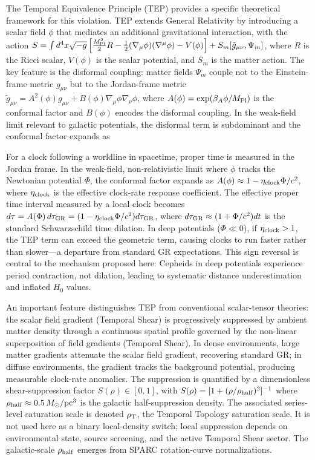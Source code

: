 \documentclass[
]{article}
\begin{document}
The Temporal Equivalence Principle (TEP) provides a specific theoretical
framework for this violation. TEP extends General Relativity by
introducing a scalar field \(\phi\) that mediates an additional
gravitational interaction, with the action
\(S = \int d^4x \sqrt{-g} \left[ \frac{M_{\rm Pl}^2}{2} R - \frac{1}{2}(\nabla_\mu
\phi)(\nabla^\mu \phi) - V(\phi) \right] + S_m[\tilde{g}_{\mu\nu},
\Psi_m]\), where \(R\) is the Ricci scalar, \(V(\phi)\) is the scalar
potential, and \(S_m\) is the matter action. The key feature is the
disformal coupling: matter fields \(\Psi_m\) couple not to the
Einstein-frame metric \(g_{\mu\nu}\) but to the Jordan-frame metric
\(\tilde{g}_{\mu\nu} = A^2(\phi) g_{\mu\nu} + B(\phi) \nabla_\mu\phi \nabla_\nu\phi\),
where \(A(\phi) = \exp(\beta_A\phi/M_{\rm Pl})\) is the conformal factor
and \(B(\phi)\) encodes the disformal coupling. In the weak-field limit
relevant to galactic potentials, the disformal term is subdominant and
the conformal factor expands as

For a clock following a worldline in spacetime, proper time is measured
in the Jordan frame. In the weak-field, non-relativistic limit where
\(\phi\) tracks the Newtonian potential \(\Phi\), the conformal factor
expands as \(A(\phi) \approx 1 - \eta_{\rm clock} \Phi/c^2\), where
\(\eta_{\rm clock}\) is the effective clock-rate response coefficient.
The effective proper time interval measured by a local clock becomes
\(d\tau = A(\Phi) \, d\tau_{\rm GR} = (1 - \eta_{\rm clock} \Phi/c^2)
d\tau_{\rm GR}\), where \(d\tau_{\rm GR} \approx (1 + \Phi/c^2) dt\) is
the standard Schwarzschild time dilation. In deep potentials
(\(\Phi \ll 0\)), if \(\eta_{\rm clock} > 1\), the TEP term can exceed
the geometric term, causing clocks to run faster rather than slower---a
departure from standard GR expectations. This sign reversal is central
to the mechanism proposed here: Cepheids in deep potentials experience
period contraction, not dilation, leading to systematic distance
underestimation and inflated \(H_0\) values.

An important feature distinguishes TEP from conventional scalar-tensor
theories: the scalar field gradient (Temporal Shear) is progressively
suppressed by ambient matter density through a continuous spatial
profile governed by the non-linear superposition of field gradients
(Temporal Shear). In dense environments, large matter gradients
attenuate the scalar field gradient, recovering standard GR; in diffuse
environments, the gradient tracks the background potential, producing
measurable clock-rate anomalies. The suppression is quantified by a
dimensionless shear-suppression factor \(S(\rho) \in [0,1]\), with
\(S(\rho) = [1 +
(\rho/\rho_{\rm half})^2]^{-1}\) where \(\rho_{\rm half} \approx
0.5\,M_\odot/\text{pc}^3\) is the galactic half-suppression density. The
associated series-level saturation scale is denoted \(\rho_{\rm T}\),
the Temporal Topology saturation scale. It is not used here as a binary
local-density switch; local suppression depends on environmental state,
source screening, and the active Temporal Shear sector. The
galactic-scale \(\rho_{\rm half}\) emerges from SPARC rotation-curve
normalizations.
\end{document}
